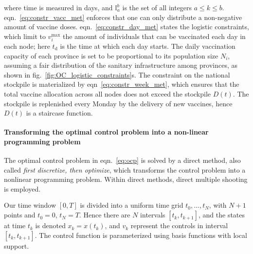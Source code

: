 where time is measured in days, and $\mathbb{I}_a^b$ is the set of all integers $a\leq k\leq b$. eqn.~\eqref{eq:constr_vacc_met} enforces that one can only distribute a non-negative amount of vaccine doses. eqn.~\eqref{eq:constr_day_met} states the logistic constraints, which limit to $v_i^\mathrm{max}$ the amount of individuals that can be vaccinated each day in each node; here $t_\mathrm{d}$ is the time at which each day starts. The daily vaccination capacity of each province is set to be proportional to its population size $N_i$, assuming a fair distribution of the sanitary infrastructure among provinces, as shown in fig.~\ref{fig:OC_logistic_constraints}s. The constraint on the national stockpile is materialized by eqn~\eqref{eq:constr_week_met}, which ensures that the total vaccine allocation across all nodes does not exceed the stockpile $D(t)$. The stockpile is replenished every Monday by the delivery of new vaccines, hence $D(t)$ is a staircase function.

\paragraph{Transforming the optimal control problem into a non-linear programming problem}


The optimal control problem in eqn.~\eqref{eq:ocp} is solved by a direct method, also called \emph{first discretize, then optimize}, which transforms the control problem into a nonlinear programming problem. Within direct methods, direct multiple shooting is employed. 


Our time window $[0,T]$ is divided into a uniform time grid $t_0,\ldots,t_N$, with $N+1$ points and $t_0=0$, $t_N=T$. Hence there are $N$ intervals $[t_k,t_{k+1}]$, and the states at time $t_k$ is denoted $x_k=x(t_k)$, and $v_k$  represent the controls in interval $[t_k,t_{k+1}]$. The control function is parameterized using basis functions with local support. 

